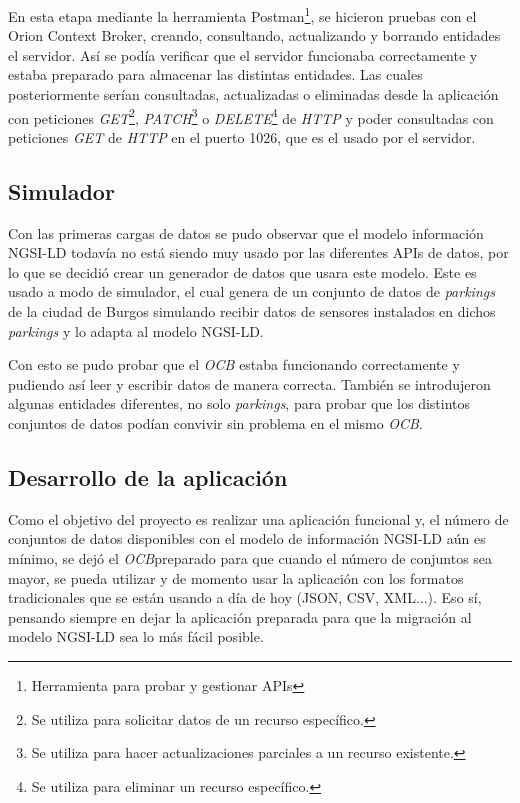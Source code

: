 En esta etapa mediante la herramienta Postman\footnote{Herramienta para probar y gestionar APIs}, se hicieron pruebas con el Orion Context Broker, creando, consultando, actualizando y borrando entidades el servidor. Así se podía verificar que el servidor funcionaba correctamente y estaba preparado para almacenar las distintas entidades.
Las cuales posteriormente serían consultadas, actualizadas o eliminadas desde la aplicación con peticiones \textit{GET}\footnote{Se utiliza para solicitar datos de un recurso específico.}, \textit{PATCH}\footnote{Se utiliza para hacer actualizaciones parciales a un recurso existente.} o \textit{DELETE}\footnote{Se utiliza para eliminar un recurso específico.} de \textit{HTTP} y poder consultadas con peticiones \textit{GET} de \textit{HTTP} en el puerto 1026, que es el usado por el servidor.
\label{fig:post-postman}

\subsection{Simulador}\label{simulador}

Con las primeras cargas de datos se pudo observar que el modelo información NGSI-LD todavía no está siendo muy usado por las diferentes APIs de datos, por lo que se decidió crear un generador de datos que usara este modelo. Este es usado a modo de simulador, el cual genera de un conjunto de datos de \textit{parkings} de la ciudad de Burgos simulando recibir datos de sensores instalados en dichos \textit{parkings} y lo adapta al modelo NGSI-LD. 

\label{fig:get-postman}


Con esto se pudo probar que el \textit{OCB}\footnotemark{} estaba funcionando correctamente y pudiendo así leer y escribir datos de manera correcta. También se introdujeron algunas entidades diferentes, no solo \textit{parkings}, para probar que los distintos conjuntos de datos podían convivir sin problema en el mismo \textit{OCB}\footnotemark[\value{footnote}]. 



\subsection{Desarrollo de la aplicación}

Como el objetivo del proyecto es realizar una aplicación funcional y, el número de conjuntos de datos disponibles con el modelo de información NGSI-LD aún es mínimo, se dejó el \textit{OCB}\footnotemark[\value{footnote}] preparado para que cuando el número de conjuntos sea mayor, se pueda utilizar y de momento usar la aplicación con los formatos tradicionales que se están usando a día de hoy (JSON, CSV, XML...). Eso sí, pensando siempre en dejar la aplicación preparada para que la migración al modelo NGSI-LD sea lo más fácil posible.

